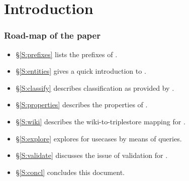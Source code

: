 
\section{Introduction}


\subsubsection*{Road-map of the paper}

\begin{itemize}
\item \S\ref{S:prefixes} lists the prefixes of \solasote.
\item \S\ref{S:entities} gives a quick introduction to \solasote.
\item \S\ref{S:classify} describes classification as provided by \solasote.
\item \S\ref{S:properties} describes the properties of \solasote.
\item \S\ref{S:wiki} describes the wiki-to-triplestore mapping for \solasote.
\item \S\ref{S:explore} explores \solasote{} for usecases by means of queries.
\item \S\ref{S:validate} discusses the issue of validation for \solasote.
\item \S\ref{S:concl} concludes this document.
\end{itemize}


